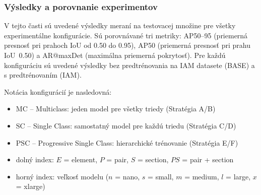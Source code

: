 \subsubsection{Výsledky a porovnanie experimentov}

V tejto časti sú uvedené výsledky meraní na testovacej množine pre všetky experimentálne konfigurácie. Sú porovnávané tri metriky: AP50--95 (priemerná presnosť pri prahoch IoU od 0.50 do 0.95), AP50 (priemerná presnosť pri prahu IoU~0.50) a AR@maxDet (maximálna priemerná pokrytosť). Pre každú konfiguráciu sú uvedené výsledky bez predtrénovania na IAM datasete (BASE) a s predtrénovaním (IAM).

Notácia konfigurácií je nasledovná:
\begin{itemize}
    \item $\mathrm{MC}$ – Multiclass: jeden model pre všetky triedy (Stratégia A/B)
    \item $\mathrm{SC}$ – Single Class: samostatný model pre každú triedu (Stratégia C/D)
    \item $\mathrm{PSC}$ – Progressive Single Class: hierarchické trénovanie (Stratégia E/F)
    \item dolný index: $E$ = element, $P$ = pair, $S$ = section, $PS$ = pair + section
    \item horný index: veľkosť modelu ($n$ = nano, $s$ = small, $m$ = medium, $l$ = large, $x$ = xlarge)
\end{itemize}

